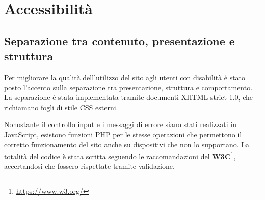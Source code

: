 \section{Accessibilità}
	\subsection{Separazione tra contenuto, presentazione e struttura}
	\par Per migliorare la qualità dell’utilizzo del sito agli utenti con disabilità  è stato posto l’accento sulla separazione tra presentazione, struttura e comportamento.
La separazione è stata implementata tramite documenti XHTML strict 1.0, che richiamano fogli di stile CSS esterni.
	\par Nonostante il controllo input e i messaggi di errore siano stati realizzati in JavaScript, esistono funzioni PHP per le stesse operazioni che permettono il corretto funzionamento del sito anche su dispositivi che non lo supportano.
La totalità del codice è stata scritta seguendo le raccomandazioni del \textbf{W3C}\footnote{\url{https://www.w3.org/}}, accertandosi che fossero rispettate tramite validazione.
